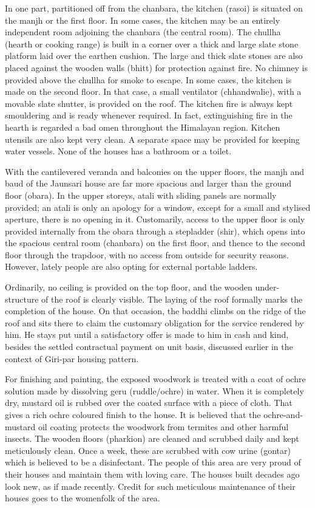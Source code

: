 In one part, partitioned off from the chanbara, the kitchen (rasoi) is situated on the manjh or the first floor. In some cases, the kitchen may be an entirely independent room adjoining the chanbara (the central room). The chullha (hearth or cooking range) is built in a corner over a thick and large slate stone platform laid over the earthen cushion. The large and thick slate stones are also placed against the wooden walls (bhitt) for protection against fire. No chimney is provided above the chullha for smoke to escape. In some cases, the kitchen is made on the second floor. In that case, a small ventilator (chhandwalie), with a movable slate shutter, is provided on the roof. The kitchen fire is always kept smouldering and is ready whenever required. In fact, extinguishing fire in the hearth is regarded a bad omen throughout the Himalayan region. Kitchen utensils are also kept very clean. A separate space may be provided for keeping water vessels. None of the houses has a bathroom or a toilet.

With the cantilevered veranda and balconies on the upper floors, the manjh and baud of the Jaunsari house are far more spacious and larger than the ground floor (obara). In the upper storeys, atali with sliding panels are normally provided; an atali is only an apology for a window, except for a small and stylised aperture, there is no opening in it. Customarily, access to the upper floor is only provided internally from the obara through a stepladder (shir), which opens into the spacious central room (chanbara) on the first floor, and thence to the second floor through the trapdoor, with no access from outside for security reasons. However, lately people are also opting for external portable ladders.

Ordinarily, no ceiling is provided on the top floor, and the wooden under-structure of the roof is clearly visible. The laying of the roof formally marks the completion of the house. On that occasion, the baddhi climbs on the ridge of the roof and sits there to claim the customary obligation for the service rendered by him. He stays put until a satisfactory offer is made to him in cash and kind, besides the settled contractual payment on unit basis, discussed earlier in the context of Giri-par housing pattern.

For finishing and painting, the exposed woodwork is treated with a coat of ochre solution made by dissolving geru (ruddle/ochre) in water. When it is completely dry, mustard oil is rubbed over the coated surface with a piece of cloth. That gives a rich ochre coloured finish to the house. It is believed that the ochre-and-mustard oil coating protects the woodwork from termites and other harmful insects. The wooden floors (pharkion) are cleaned and scrubbed daily and kept meticulously clean. Once a week, these are scrubbed with cow urine (gontar) which is believed to be a disinfectant. The people of this area are very proud of their houses and maintain them with loving care. The houses built decades ago look new, as if made recently. Credit for such meticulous maintenance of their houses goes to the womenfolk of the area.

